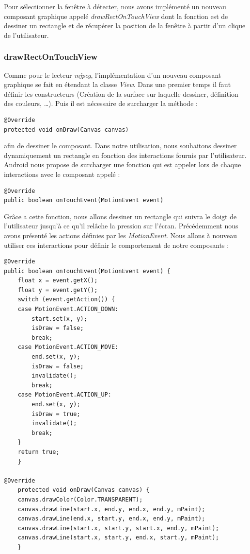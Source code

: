 \indent Pour sélectionner la fenêtre à détecter, nous avons implémenté un nouveau
composant graphique appelé \textit{drawRectOnTouchView} dont la fonction est de
dessiner un rectangle et de récupérer la position de la fenêtre à partir d'un
clique de l'utilisateur.
\subsubsection{drawRectOnTouchView}
Comme pour le lecteur \textit{mjpeg}, l'implémentation d'un nouveau composant
graphique se fait en étendant la classe \textit{View}. Dans une premier temps il
faut définir les constructeurs (Création de la surface sur laquelle dessiner,
définition des couleurs, \ldots). Puis il est nécessaire de surcharger la
méthode :
\begin{lstlisting}
@Override
protected void onDraw(Canvas canvas)
\end{lstlisting}
afin de dessiner le composant. Dans notre utilisation, nous souhaitons dessiner
dynamiquement un rectangle en fonction des interactions fournis par l'utilisateur.
Android nous propose de surcharger une fonction qui est appeler lors de chaque
interactions avec le composant appelé : 
\begin{lstlisting}
@Override
public boolean onTouchEvent(MotionEvent event)
\end{lstlisting}
Grâce a cette fonction, nous allons dessiner un rectangle qui suivra le doigt de
l'utilisateur jusqu'à ce qu'il relâche la pression sur l'écran.
Précédemment nous avons présenté les actions définies par les
\textit{MotionEvent}. Nous allons à nouveau utiliser ces interactions
pour définir le comportement de notre composants :
\begin{lstlisting}[caption={Draw Rectangle Component}] 
@Override
public boolean onTouchEvent(MotionEvent event) {
	float x = event.getX();
	float y = event.getY();
	switch (event.getAction()) {
	case MotionEvent.ACTION_DOWN:
	    start.set(x, y);
	    isDraw = false;
	    break;
	case MotionEvent.ACTION_MOVE:
	    end.set(x, y);
	    isDraw = false;
	    invalidate();
	    break;
	case MotionEvent.ACTION_UP:
	    end.set(x, y);
	    isDraw = true;
	    invalidate();
	    break;
	}
	return true;
    }
    
@Override
    protected void onDraw(Canvas canvas) {
	canvas.drawColor(Color.TRANSPARENT);
	canvas.drawLine(start.x, end.y, end.x, end.y, mPaint);
	canvas.drawLine(end.x, start.y, end.x, end.y, mPaint);
	canvas.drawLine(start.x, start.y, start.x, end.y, mPaint);
	canvas.drawLine(start.x, start.y, end.x, start.y, mPaint);
    }
\end{lstlisting}
